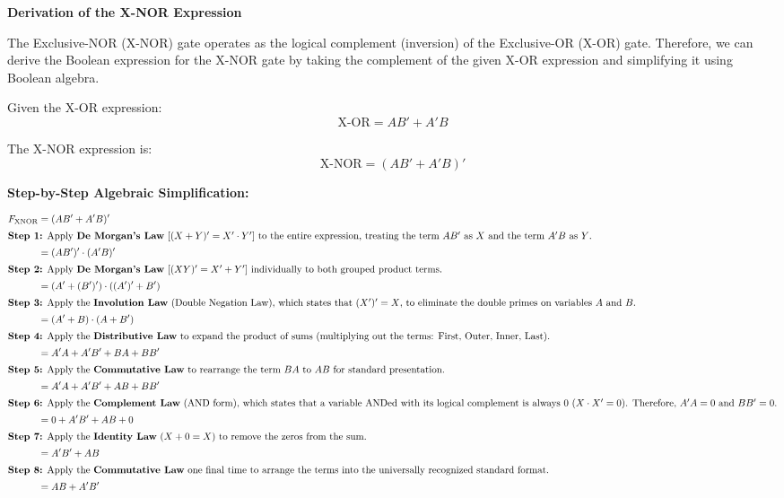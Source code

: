 \documentclass[12pt,a3paper]{article}
\begin{document}
\begin{enumerate}
\begin{tcolorbox}[enhanced,breakable,ansbox,colback=cA!4,colframe=cA,boxrule=0.8pt,arc=5pt,title={\textbf{Answer}},fonttitle=\bfseries\color{white},colbacktitle=cA]
\textbf{Derivation of the X-NOR Expression}

The Exclusive-NOR (X-NOR) gate operates as the logical complement (inversion) of the Exclusive-OR (X-OR) gate. Therefore, we can derive the Boolean expression for the X-NOR gate by taking the complement of the given X-OR expression and simplifying it using Boolean algebra.

Given the X-OR expression:
\[ \text{X-OR} = AB' + A'B \]

The X-NOR expression is:
\[ \text{X-NOR} = (AB' + A'B)' \]

\vspace{0.3cm}
\textbf{Step-by-Step Algebraic Simplification:}

\begin{align*}
F_{\text{XNOR}} &= (AB' + A'B)' \\
\intertext{\textbf{Step 1:} Apply \textbf{De Morgan's Law} [$(X + Y)' = X' \cdot Y'$] to the entire expression, treating the term $AB'$ as $X$ and the term $A'B$ as $Y$.}
&= (AB')' \cdot (A'B)' \\
\intertext{\textbf{Step 2:} Apply \textbf{De Morgan's Law} [$(XY)' = X' + Y'$] individually to both grouped product terms.}
&= (A' + (B')') \cdot ((A')' + B') \\
\intertext{\textbf{Step 3:} Apply the \textbf{Involution Law} (Double Negation Law), which states that $(X')' = X$, to eliminate the double primes on variables $A$ and $B$.}
&= (A' + B) \cdot (A + B') \\
\intertext{\textbf{Step 4:} Apply the \textbf{Distributive Law} to expand the product of sums (multiplying out the terms: First, Outer, Inner, Last).}
&= A'A + A'B' + BA + BB' \\
\intertext{\textbf{Step 5:} Apply the \textbf{Commutative Law} to rearrange the term $BA$ to $AB$ for standard presentation.}
&= A'A + A'B' + AB + BB' \\
\intertext{\textbf{Step 6:} Apply the \textbf{Complement Law} (AND form), which states that a variable ANDed with its logical complement is always $0$ ($X \cdot X' = 0$). Therefore, $A'A = 0$ and $BB' = 0$.}
&= 0 + A'B' + AB + 0 \\
\intertext{\textbf{Step 7:} Apply the \textbf{Identity Law} ($X + 0 = X$) to remove the zeros from the sum.}
&= A'B' + AB \\
\intertext{\textbf{Step 8:} Apply the \textbf{Commutative Law} one final time to arrange the terms into the universally recognized standard format.}
&= AB + A'B'
\end{align*}


\end{tcolorbox}
\end{enumerate}
\end{document}
